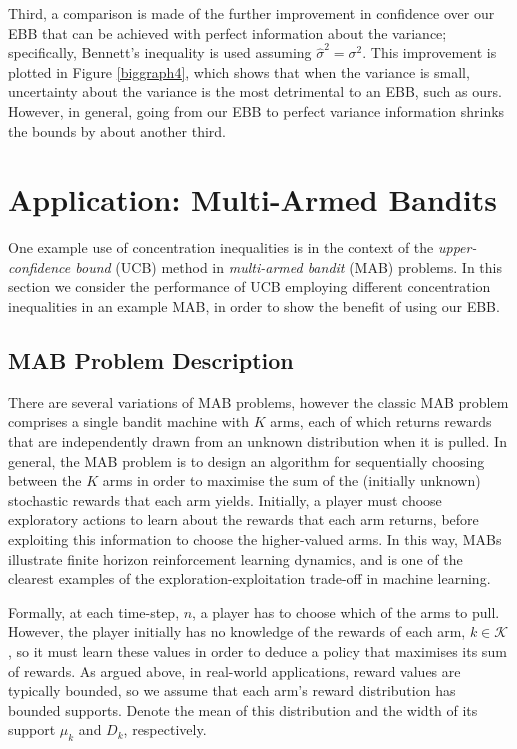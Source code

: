 \documentclass[runningheads, envcountsame, a4paper]{llncs}
\begin{document}
Third, a comparison is made of the further improvement in confidence over our EBB that can be achieved with perfect information about the variance; specifically, Bennett's inequality is used 
assuming $\hat{\sigma}^2=\sigma^2$. 
This improvement is plotted in Figure \ref{biggraph4}, which shows that when the variance is small, uncertainty about the variance is the most detrimental to an EBB, such as ours.
However, in general, going from our EBB to perfect variance information shrinks the bounds by about another third.




\section{Application: Multi-Armed Bandits}
\label{sec:bandits}
One example use of concentration inequalities is in the context of the \textit{upper-confidence bound} (UCB) method in \textit{multi-armed bandit} (MAB) problems.
In this section we consider the performance of UCB employing different concentration inequalities in an example MAB, in order to show the benefit of using our EBB.

\subsection{MAB Problem Description}
There are several variations of MAB problems, however the classic MAB \cite{Robbins1952} problem comprises a single bandit machine with $K$ arms, each of which returns rewards that are independently drawn from an unknown distribution when it is pulled. 
In general, the MAB problem is to design an algorithm for sequentially choosing between the $K$ arms in order to maximise the sum of the (initially unknown) stochastic rewards that each arm yields.
Initially, a player must choose exploratory actions to learn about the rewards that each arm returns, before exploiting this information to choose the higher-valued arms.
In this way, MABs illustrate finite horizon reinforcement learning dynamics, 
and is one of the clearest examples of the exploration-exploitation trade-off in machine learning.

Formally, at each time-step, $n$, 
a player has to choose which of the arms to pull.
However, the player initially has no knowledge of the rewards of each arm, $k\in \mathcal{K}$, so it must learn these values in order to deduce a policy that maximises its sum of rewards.
As argued above, in real-world applications, reward values are typically bounded, so we assume that each arm's reward distribution has bounded supports. 
Denote the mean of this distribution and the width of its support $\mu_k$ and $D_k$, respectively. 
\end{document}
